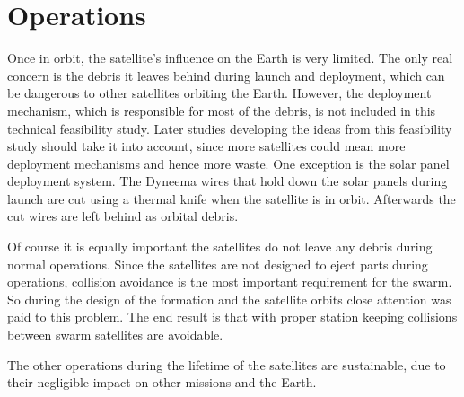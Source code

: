 \section{Operations}
\label{SSOPE}

Once in orbit, the satellite's influence on the Earth is very limited. The only real concern is the debris it leaves behind during launch and deployment, which can be dangerous to other satellites orbiting the Earth.
However, the deployment mechanism, which is responsible for most of the debris, is not included in this technical feasibility study. Later studies developing the ideas from this feasibility study should take it into account, since more satellites could mean more deployment mechanisms and hence more waste. One exception is the solar panel deployment system. The Dyneema wires that hold down the solar panels during launch are cut using a thermal knife when the satellite is in orbit. Afterwards the cut wires are left behind as orbital debris.

Of course it is equally important the satellites do not leave any debris during normal operations. Since the satellites are not designed to eject parts during operations, collision avoidance is the most important requirement for the swarm. So during the design of the formation and the satellite orbits close attention was paid to this problem. The end result is that with proper station keeping collisions between swarm satellites are avoidable. 

The other operations during the lifetime of the satellites are sustainable, due to their negligible impact on other missions and the Earth.